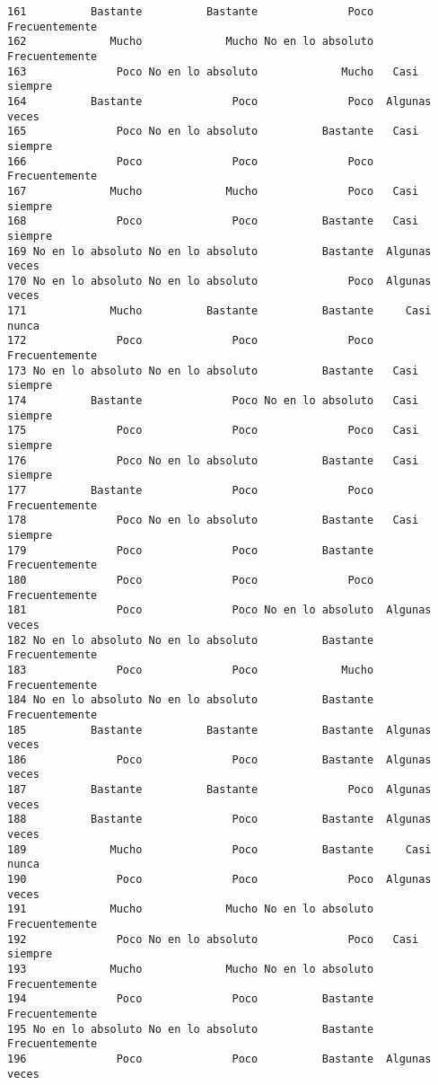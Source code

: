 \documentclass[
  letterpaper,
  DIV=11,
  numbers=noendperiod]{scrartcl}
\begin{document}
\begin{verbatim}
161          Bastante          Bastante              Poco Frecuentemente
162             Mucho             Mucho No en lo absoluto Frecuentemente
163              Poco No en lo absoluto             Mucho   Casi siempre
164          Bastante              Poco              Poco  Algunas veces
165              Poco No en lo absoluto          Bastante   Casi siempre
166              Poco              Poco              Poco Frecuentemente
167             Mucho             Mucho              Poco   Casi siempre
168              Poco              Poco          Bastante   Casi siempre
169 No en lo absoluto No en lo absoluto          Bastante  Algunas veces
170 No en lo absoluto No en lo absoluto              Poco  Algunas veces
171             Mucho          Bastante          Bastante     Casi nunca
172              Poco              Poco              Poco Frecuentemente
173 No en lo absoluto No en lo absoluto          Bastante   Casi siempre
174          Bastante              Poco No en lo absoluto   Casi siempre
175              Poco              Poco              Poco   Casi siempre
176              Poco No en lo absoluto          Bastante   Casi siempre
177          Bastante              Poco              Poco Frecuentemente
178              Poco No en lo absoluto          Bastante   Casi siempre
179              Poco              Poco          Bastante Frecuentemente
180              Poco              Poco              Poco Frecuentemente
181              Poco              Poco No en lo absoluto  Algunas veces
182 No en lo absoluto No en lo absoluto          Bastante Frecuentemente
183              Poco              Poco             Mucho Frecuentemente
184 No en lo absoluto No en lo absoluto          Bastante Frecuentemente
185          Bastante          Bastante          Bastante  Algunas veces
186              Poco              Poco          Bastante  Algunas veces
187          Bastante          Bastante              Poco  Algunas veces
188          Bastante              Poco          Bastante  Algunas veces
189             Mucho              Poco          Bastante     Casi nunca
190              Poco              Poco              Poco  Algunas veces
191             Mucho             Mucho No en lo absoluto Frecuentemente
192              Poco No en lo absoluto              Poco   Casi siempre
193             Mucho             Mucho No en lo absoluto Frecuentemente
194              Poco              Poco          Bastante Frecuentemente
195 No en lo absoluto No en lo absoluto          Bastante Frecuentemente
196              Poco              Poco          Bastante  Algunas veces

\end{verbatim}
\end{document}
